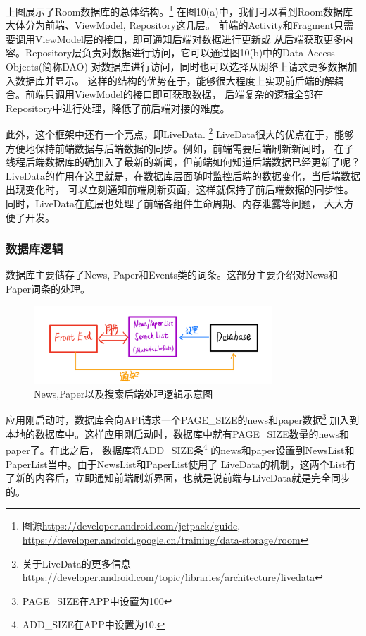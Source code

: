 \documentclass[UTF8]{article}
\begin{document}
上图展示了Room数据库的总体结构。\footnote{图源\url{https://developer.android.com/jetpack/guide}, \url{https://developer.android.google.cn/training/data-storage/room}}
在图10(a)中，我们可以看到Room数据库大体分为前端、ViewModel, Repository这几层。
前端的Activity和Fragment只需要调用ViewModel层的接口，即可通知后端对数据进行更新或
从后端获取更多内容。Repository层负责对数据进行访问，它可以通过图10(b)中的Data Access Objects(简称DAO)
对数据库进行访问，同时也可以选择从网络上请求更多数据加入数据库并显示。
这样的结构的优势在于，能够很大程度上实现前后端的解耦合。前端只调用ViewModel的接口即可获取数据，
后端复杂的逻辑全部在Repository中进行处理，降低了前后端对接的难度。

此外，这个框架中还有一个亮点，即LiveData. \footnote{关于LiveData的更多信息\url{https://developer.android.com/topic/libraries/architecture/livedata}}
LiveData很大的优点在于，能够方便地保持前端数据与后端数据的同步。例如，前端需要后端刷新新闻时，
在子线程后端数据库的确加入了最新的新闻，但前端如何知道后端数据已经更新了呢？
LiveData的作用在这里就是，在数据库层面随时监控后端的数据变化，当后端数据出现变化时，
可以立刻通知前端刷新页面，这样就保持了前后端数据的同步性。同时，LiveData在底层也处理了前端各组件生命周期、内存泄露等问题，
大大方便了开发。
\newpage
\subsubsection{数据库逻辑}
数据库主要储存了News, Paper和Events类的词条。这部分主要介绍对News和Paper词条的处理。

\begin{figure}[h]
    \label{Ratio}
    \centering
        \includegraphics[width=0.8\textwidth]{db}
        \caption{News,Paper以及搜索后端处理逻辑示意图}
    \end{figure}


应用刚启动时，数据库会向API请求一个PAGE\_SIZE的news和paper数据\footnote{PAGE\_SIZE在APP中设置为100}
加入到本地的数据库中。这样应用刚启动时，数据库中就有PAGE\_SIZE数量的news和paper了。在此之后，
数据库将ADD\_SIZE条\footnote{ADD\_SIZE在APP中设置为10.}
的news和paper设置到NewsList和PaperList当中。由于NewsList和PaperList使用了
LiveData的机制，这两个List有了新的内容后，立即通知前端刷新界面，也就是说前端与LiveData就是完全同步的。
\end{document}
